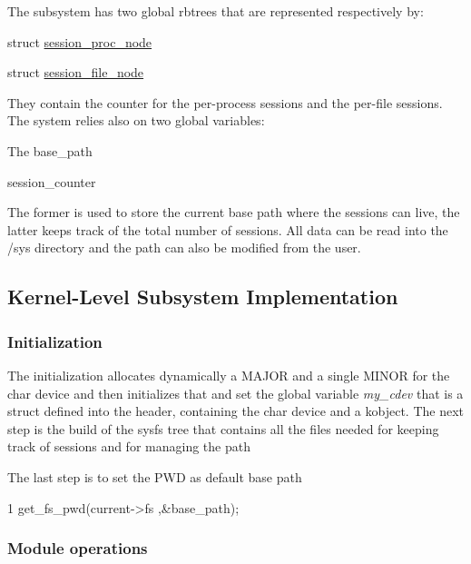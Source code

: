The subsystem has two global rbtrees that are represented respectively by\+:
\begin{DoxyItemize}
\item struct \hyperlink{structsession__proc__node}{session\+\_\+proc\+\_\+node}
\item struct \hyperlink{structsession__file__node}{session\+\_\+file\+\_\+node}
\end{DoxyItemize}

They contain the counter for the per-\/process sessions and the per-\/file sessions. The system relies also on two global variables\+:
\begin{DoxyItemize}
\item The base\+\_\+path
\item session\+\_\+counter
\end{DoxyItemize}

The former is used to store the current base path where the sessions can live, the latter keeps track of the total number of sessions. All data can be read into the /sys directory and the path can also be modified from the user.

\subsection*{Kernel-\/\+Level Subsystem Implementation}

\subsubsection*{Initialization}

The initialization allocates dynamically a M\+A\+J\+OR and a single M\+I\+N\+OR for the char device and then initializes that and set the global variable {\itshape my\+\_\+cdev} that is a struct defined into the header, containing the char device and a kobject. The next step is the build of the sysfs tree that contains all the files needed for keeping track of sessions and for managing the path



The last step is to set the P\+WD as default base path


\begin{DoxyCode}
1 get\_fs\_pwd(current->fs ,&base\_path);
\end{DoxyCode}


\subsubsection*{Module operations}

